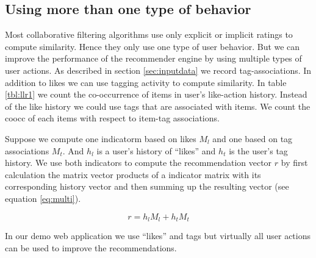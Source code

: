 \subsection{Using more than one type of behavior}
\label{sec:multimodal}

Most collaborative filtering algorithms use only explicit or implicit ratings to compute similarity. Hence they only use one type of user behavior.
But we can improve the performance of the recommender engine by using multiple types of user actions. As described in section \ref{sec:inputdata} we record tag-associations. In addition to likes we can use tagging activity to compute similarity. In table \ref{tbl:llr1} we count the co-occurrence of items in user's like-action history. Instead of the like history we could use tags that are associated with items. We count the \gls{coocc} of each items with respect to item-tag associations.

Suppose we compute one \gls{indicatorm} based on likes $M_l$ and one based on tag associations $M_t$. And $h_l$ is a user's history of ``likes'' and $h_t$ is the user's tag history. We use both indicators to compute the recommendation vector $r$ by first calculation the matrix vector products of a indicator matrix with its corresponding history vector and then summing up the resulting vector (see equation \ref{eq:multi}).

\begin{equation}
  \label{eq:multi}
  r = h_l M_l + h_t M_t
\end{equation}

In our demo web application we use ``likes'' and tags but virtually all user actions can be used to improve the recommendations.
